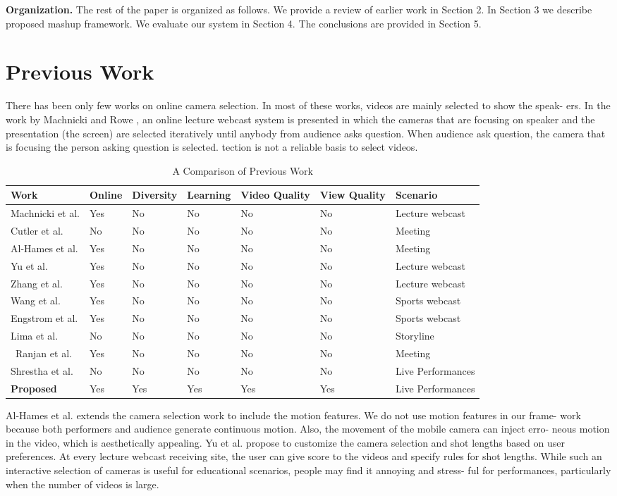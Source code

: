 \documentclass[conference]{IEEEtran}
\begin{document}
\textbf{Organization. }The rest of the paper is organized as follows.
We provide a review of earlier work in Section 2. In Section 3 we
describe proposed mashup framework. We evaluate our system in
Section 4. The conclusions are provided in Section 5.

\section{Previous Work}
There has been only few works on online camera selection. In
most of these works, videos are mainly selected to show the speak-
ers. In the work by Machnicki and Rowe \cite{9}, an online lecture
webcast system is presented in which the cameras that are focusing
on speaker and the presentation (the screen) are selected iteratively
until anybody from audience asks question. When audience ask
question, the camera that is focusing the person asking question is
selected.
tection is not a reliable basis to select videos.
\begin{table}
\centering
\caption{A Comparison of Previous Work}
\begin{tabular}{|l|l|l|l|l|l|l} \hline
Work& Online &Diversity& Learning & Video Quality & View Quality& Scenario \\ \hline
Machnicki et al. \cite{9} &Yes &No&No&No&No & Lecture webcast\\ \hline
Cutler et al. \cite{6}&No&No&No&No&No&Meeting\\ \hline
Al-Hames et al. \cite{3}&Yes&No&No&No&No&Meeting\\ \hline
Yu et al. \cite{20} &Yes&No&No&No&No&Lecture webcast\\ \hline
Zhang et al. \cite{21} &Yes&No&No&No&No&Lecture webcast\\ \hline
Wang et al. \cite{16}&Yes&No&No&No&No&Sports webcast\\ \hline
Engstrom et al. \cite{8}&Yes&No&No&No&No&Sports webcast\\ \hline
Lima et al. \cite{7}&No&No&No&No&No&Storyline\\ \hline\
Ranjan et al. \cite{12}&Yes&No&No&No&No&Meeting\\ \hline
Shrestha et al. \cite{15}&No&No&No&No&No&Live Performances\\ \hline
\textbf{Proposed}\cite{15}&Yes&Yes&Yes&Yes&Yes&Live Performances\\ \hline\end{tabular}
\end{table}

Al-Hames et al. \cite{3} extends the camera selection work to include
the motion features. We do not use motion features in our frame-
work because both performers and audience generate continuous
motion. Also, the movement of the mobile camera can inject erro-
neous motion in the video, which is aesthetically appealing. Yu et
al. \cite{20} propose to customize the camera selection and shot lengths
based on user preferences. At every lecture webcast receiving site,
the user can give score to the videos and specify rules for shot
lengths. While such an interactive selection of cameras is useful
for educational scenarios, people may find it annoying and stress-
ful for performances, particularly when the number of videos is
large.
\end{document}
